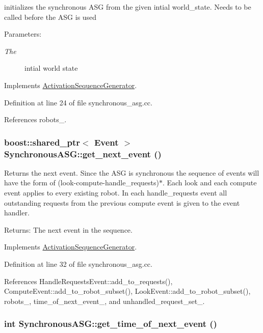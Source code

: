initializes the synchronous ASG from the given intial world\_\-state. Needs to be called before the ASG is used \begin{Desc}
\item[Parameters:]
\begin{description}
\item[{\em The}]intial world state \end{description}
\end{Desc}


Implements \hyperlink{class_activation_sequence_generator_01592eb2b4293512d2ad00dc4adf0361}{ActivationSequenceGenerator}.

Definition at line 24 of file synchronous\_\-asg.cc.

References robots\_\-.\hypertarget{class_synchronous_a_s_g_05fbdbd3ed9638ab90c3817944fbba95}{
\subsubsection[get\_\-next\_\-event]{\setlength{\rightskip}{0pt plus 5cm}boost::shared\_\-ptr$<$ Event $>$ SynchronousASG::get\_\-next\_\-event ()}}
\label{class_synchronous_a_s_g_05fbdbd3ed9638ab90c3817944fbba95}


Returns the next event. Since the ASG is synchronous the sequence of events will have the form of (look-compute-handle\_\-requests)$\ast$. Each look and each compute event applies to every existing robot. In each handle\_\-requests event all outstanding requests from the previous compute event is given to the event handler. \begin{Desc}
\item[Returns:]The next event in the sequence. \end{Desc}


Implements \hyperlink{class_activation_sequence_generator_cf20a8caaee580655c57b8843d82d5f5}{ActivationSequenceGenerator}.

Definition at line 32 of file synchronous\_\-asg.cc.

References HandleRequestsEvent::add\_\-to\_\-requests(), ComputeEvent::add\_\-to\_\-robot\_\-subset(), LookEvent::add\_\-to\_\-robot\_\-subset(), robots\_\-, time\_\-of\_\-next\_\-event\_\-, and unhandled\_\-request\_\-set\_\-.\hypertarget{class_synchronous_a_s_g_b675d2066e00287119c772b0411531b5}{
\subsubsection[get\_\-time\_\-of\_\-next\_\-event]{\setlength{\rightskip}{0pt plus 5cm}int SynchronousASG::get\_\-time\_\-of\_\-next\_\-event ()}}
\label{class_synchronous_a_s_g_b675d2066e00287119c772b0411531b5}



